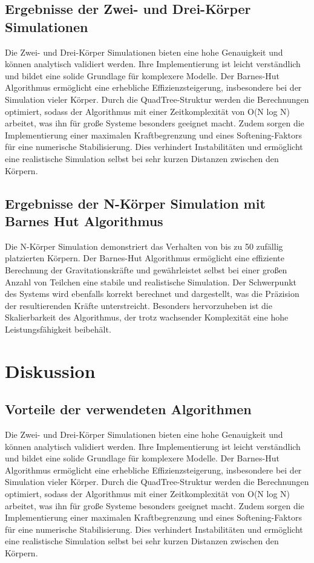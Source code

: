 \documentclass[a4paper,12pt,twoside]{article}
\begin{document}
\subsection{Ergebnisse der Zwei- und Drei-Körper Simulationen}
Die Zwei- und Drei-Körper Simulationen bieten eine hohe Genauigkeit und können analytisch validiert werden. Ihre Implementierung ist leicht verständlich und bildet eine solide Grundlage für komplexere Modelle. Der Barnes-Hut Algorithmus ermöglicht eine erhebliche Effizienzsteigerung, insbesondere bei der Simulation vieler Körper. Durch die QuadTree-Struktur werden die Berechnungen optimiert, sodass der Algorithmus mit einer Zeitkomplexität von O(N log N) arbeitet, was ihn für große Systeme besonders geeignet macht. Zudem sorgen die Implementierung einer maximalen Kraftbegrenzung und eines Softening-Faktors für eine numerische Stabilisierung. Dies verhindert Instabilitäten und ermöglicht eine realistische Simulation selbst bei sehr kurzen Distanzen zwischen den Körpern.

\subsection{Ergebnisse der N-Körper Simulation mit Barnes Hut Algorithmus}
Die N-Körper Simulation demonstriert das Verhalten von bis zu 50 zufällig platzierten Körpern. Der Barnes-Hut Algorithmus ermöglicht eine effiziente Berechnung der Gravitationskräfte und gewährleistet selbst bei einer großen Anzahl von Teilchen eine stabile und realistische Simulation. Der Schwerpunkt des Systems wird ebenfalls korrekt berechnet und dargestellt, was die Präzision der resultierenden Kräfte unterstreicht. Besonders hervorzuheben ist die Skalierbarkeit des Algorithmus, der trotz wachsender Komplexität eine hohe Leistungsfähigkeit beibehält.


\section{Diskussion}

\subsection{Vorteile der verwendeten Algorithmen}
Die Zwei- und Drei-Körper Simulationen bieten eine hohe Genauigkeit und können analytisch validiert werden. Ihre Implementierung ist leicht verständlich und bildet eine solide Grundlage für komplexere Modelle. Der Barnes-Hut Algorithmus ermöglicht eine erhebliche Effizienzsteigerung, insbesondere bei der Simulation vieler Körper. Durch die QuadTree-Struktur werden die Berechnungen optimiert, sodass der Algorithmus mit einer Zeitkomplexität von O(N log N) arbeitet, was ihn für große Systeme besonders geeignet macht. Zudem sorgen die Implementierung einer maximalen Kraftbegrenzung und eines Softening-Faktors für eine numerische Stabilisierung. Dies verhindert Instabilitäten und ermöglicht eine realistische Simulation selbst bei sehr kurzen Distanzen zwischen den Körpern.
\end{document}
